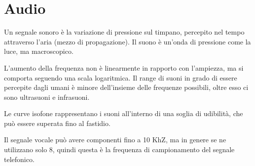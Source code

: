 \section{Audio}
Un segnale sonoro è la variazione di pressione sul timpano, percepito nel tempo attraverso l'aria (mezzo di propagazione). Il suono è un'onda di pressione come la luce, ma macroscopico.

L'aumento della frequenza non è linearmente in rapporto con l'ampiezza, ma si comporta seguendo una scala logaritmica. Il range di suoni in grado di essere percepite dagli umani è minore dell'insieme delle frequenze possibili, oltre esso ci sono ultrasuoni e infrasuoni. 

Le curve isofone rappresentano i suoni all'interno di una soglia di udibilità, che può essere superata fino al fastidio. 

Il segnale vocale può avere componenti fino a 10 KhZ, ma in genere se ne utilizzano solo 8, quindi questa è la frequenza di campionamento del segnale telefonico. 